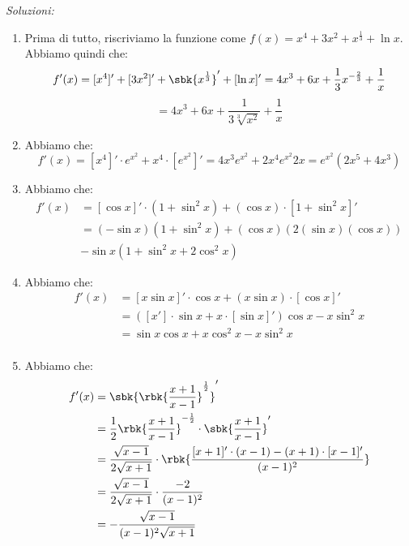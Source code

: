 \documentclass[a4paper, 12pt]{report}
\begin{document}
    \textit{Soluzioni:}

    \begin{enumerate}
        \item Prima di tutto, riscriviamo la funzione come $f(x) = x^4+3x^2+{x}^{\frac{1}{3}} +\ln x$. Abbiamo quindi che:
        \[f'(x) = [x^4]'+[3x^2]'+\sbk{{x}^{\frac{1}{3}}}' +[\ln x]' =4x^3+6x+\frac{1}{3}x^{-\frac{2}{3}}+ \frac{1}{x} \]
        \[= 4x^3+6x+\frac{1}{3\sqrt[3]{x^2}}+\frac{1}{x}\]

        \item Abbiamo che:
        \[f'(x) = [x^4]' \cdot e^{x^2} + x^4 \cdot [e^{x^2}]' = 4x^3e^{x^2} + 2x^4e^{x^2}2x = e^{x^2}(2x^5+4x^3)\]

        \item Abbiamo che:
        \[\begin{split}
            f'(x) &= [\cos x]' \cdot (1+\sin^2 x) + (\cos x) \cdot [1+\sin^2 x]'\\
            &= (-\sin x)(1+\sin^2 x) + (\cos x)(2(\sin x)(\cos x))\\
            & -\sin x(1+\sin^2 x + 2 \cos^2 x)
        \end{split}\]

        \item Abbiamo che:
        \[\begin{split}
            f'(x) &= [x \sin x]' \cdot \cos x + (x \sin x) \cdot [\cos x]' \\
            &= ([x'] \cdot \sin x + x \cdot [\sin x]') \cos x - x \sin^2 x \\
            &= \sin x \cos x + x \cos^2 x - x \sin^2 x \\
        \end{split}\]

        \item Abbiamo che:
        \[\begin{split}
            f'(x) &= \sbk{\rbk{\frac{x+1}{x-1}}^{\frac{1}{2}}}'\\
            &= \frac{1}{2}\rbk{\frac{x+1}{x-1}}^{-\frac{1}{2}} \cdot \sbk{\frac{x+1}{x-1}}' \\
            &= \frac{\sqrt{x-1}}{2\sqrt{x+1}} \cdot \rbk{\frac{[x+1]' \cdot (x-1) - (x+1) \cdot [x-1]'}{(x-1)^2}} \\
            &= \frac{\sqrt{x-1}}{2\sqrt{x+1}} \cdot \frac{-2}{(x-1)^2} \\
            &= -\frac{\sqrt{x-1}}{(x-1)^2 \sqrt{x+1}} \\
        \end{split}\]



\end{enumerate}
\end{document}
